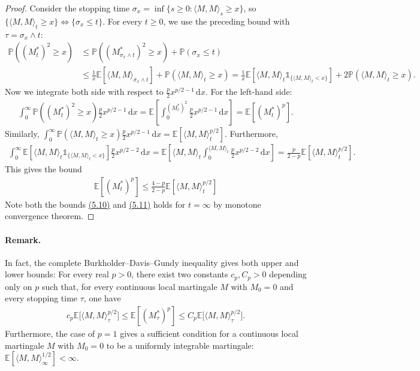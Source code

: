 \documentclass{article}
\numberwithin{equation}{section}
\newcommand{\E}{\mathbb{E}}
\renewcommand{\P}{\mathbb{P}}
\renewcommand{\d}{\mathrm{d}}
\theoremstyle{plain}
\theoremstyle{definition}
\begin{document}
\begin{proof}
Consider the stopping time $\sigma_x=\inf\{s\geq 0:\langle M,M\rangle_s\geq x\}$, so $\{\langle M,M\rangle_t\geq x\}\Leftrightarrow\{\sigma_x\leq t\}$. For every $t\geq 0$, we use the preceding bound with $\tau=\sigma_x\wedge t$:
\begin{align*}
	\P\left((M^*_t)^2\geq x\right)&\leq\P((M^*_{\sigma_x\wedge t})^2\geq x)+\P(\sigma_x\leq t)\\
	&\leq\frac{1}{x}\E\left[\langle M,M\rangle_{\sigma_x\wedge t}\right] + \P\left(\langle M,M\rangle_t\geq x\right) = \frac{1}{x}\E\left[\langle M,M\rangle_t\mathds{1}_{\{\langle M,M\rangle_t<x\}}\right] + 2\P\left(\langle M,M\rangle_t\geq x\right).
\end{align*}
Now we integrate both side with respect to $\frac{p}{2}x^{p/2-1}\,\d x$. For the left-hand side:
\begin{align*}
	\int_0^\infty \P\left((M^*_t)^2\geq x\right)\frac{p}{2}x^{p/2-1}\,\d x = \E\left[\int_0^{(M_t^*)^2}\frac{p}{2}x^{p/2-1}\,\d x\right] = \E\left[(M_t^*)^p\right].
\end{align*}
Similarly, $\int_0^\infty \P\left(\langle M,M\rangle_t\geq x\right)\frac{p}{2}x^{p/2-1}\,\d x=\E\left[\langle M,M\rangle_t^{p/2}\right]$. Furthermore,
\begin{align*}
	\int_0^\infty \E\left[\langle M,M\rangle_t\mathds{1}_{\{\langle M,M\rangle_t<x\}}\right]\frac{p}{2}x^{p/2-2}\,\d x = \E\left[\langle M,M\rangle_t\int_0^{\langle M,M\rangle_t}\frac{p}{2}x^{p/2-2}\,\d x\right]=\frac{p}{2-p}\E\left[\langle M,M\rangle^{p/2}_t\right].
\end{align*}
This gives the bound
\begin{align*}
	\E\left[(M_t^*)^p\right]\leq\frac{4-p}{2-p}\E\left[\langle M,M\rangle^{p/2}_t\right]\tag{5.11}\label{eq:5.11}
\end{align*}
Note both the bounds \hyperref[eq:5.10]{(5.10)} and \hyperref[eq:5.11]{(5.11)} holds for $t=\infty$ by monotone convergence theorem.
\end{proof}

\paragraph{Remark.} In fact, the complete Burkholder–Davis–Gundy inequality gives both upper and lower bounds: For every real $p > 0$,
there exist two constants $c_p, C_p > 0$ depending only on $p$ such that, for every continuous local martingale $M$ with $M_0=0$ and every stopping time $\tau$, one have
\begin{align*}
	c_p\E\bigl[\langle M,M\rangle_\tau^{p/2}\bigr]\leq \E\left[(M_\tau^*)^p\right]\leq C_p\E\bigl[\langle M,M\rangle_\tau^{p/2}\bigr].
\end{align*}
Furthermore, the case of $p=1$ gives a sufficient condition for a continuous local martingale $M$ with $M_0=0$ to be a uniformly integrable martingale: $\E[\langle M,M\rangle_\infty^{1/2}]<\infty$.
\end{document}
